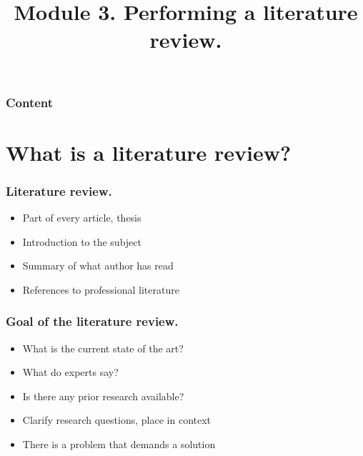\documentclass[aspectratio=169]{beamer}
\title{Module 3. Performing a literature review.}
\subtitle{\coursename}
\author{\lecturers}   %
\date{\academicyear}
\begin{document}
\begin{frame}
    \maketitle
\end{frame}

\begin{frame}
    \frametitle{Content}

    \tableofcontents
\end{frame}

\section{What is a literature review?}

\begin{frame}
    \frametitle{Literature review.}

    \begin{itemize}
        \item Part of every article, thesis
        \item Introduction to the subject
        \item Summary of what author has read
        \item References to professional literature
    \end{itemize}

\end{frame}

\begin{frame}
    \frametitle{Goal of the literature review.}

    \begin{itemize}
        \item What is the current state of the art?
        \item What do experts say?
        \item Is there any prior research available?
        \item Clarify research questions, place in context
        \item There is a problem that demands a solution
    \end{itemize}

    \bigskip

\end{frame}
\end{document}
